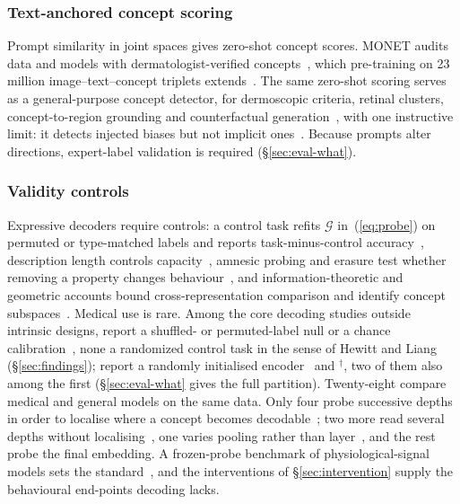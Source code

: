 \subsubsection{Text-anchored concept scoring}

Prompt similarity in joint spaces gives zero-shot concept scores. MONET audits data and models with
dermatologist-verified concepts~\cite{kim2024transparent}, which pre-training on 23 million
image--text--concept triplets extends~\cite{nie2025explainable}. The same zero-shot scoring serves as a general-purpose concept detector, for dermoscopic criteria, retinal
clusters, concept-to-region grounding and counterfactual
generation~\cite{patricio2023conceptbased,mensah2026interpretable,luo2025xbench,sadashivaiah2024explaining}, with one
instructive limit: it detects injected biases but not implicit ones~\cite{bertolini2025strengths}. Because prompts alter directions,
expert-label validation is required (\S\ref{sec:eval-what}).

\subsubsection{Validity controls}

Expressive decoders require controls: a control task refits $\mathcal G$ in~(\ref{eq:probe}) on permuted or
type-matched labels and reports task-minus-control accuracy~\cite{hewitt2019designing}, description length
controls capacity~\cite{voita2020information}, amnesic probing and erasure test whether removing a property
changes behaviour~\cite{elazar2020amnesic,ravfogel2020null,belrose2023leace}, and information-theoretic and
geometric accounts bound cross-representation comparison and identify concept
subspaces~\cite{pimentel2020informationtheoretic,guerner2023geometric}. Medical use is rare. Among the \Ndecni{} core decoding studies outside intrinsic
designs, \Nprobectrl{} report a shuffled- or permuted-label null or a chance
calibration~\cite{liang2026cheap,rahbar2026frozen,vig2026do,bertolini2025strengths,arasteh2026candor,steiner2026when,li2026acquisition,cajas2026shortkit},
none a randomized control task in the sense of
Hewitt and Liang (\S\ref{sec:findings}); \Nproberand{} report a randomly initialised
encoder~\cite{rahbar2026frozen,arasteh2026candor,svatko2026deep,farquhar2026pretraining} and \cite{tariq2024self}$^{\dagger}$, two of them also among the first (\S\ref{sec:eval-what} gives the full partition).
Twenty-eight compare medical and general models on the same data. Only four probe successive depths in order to
localise where a concept becomes decodable~\cite{pedersen2026look,rahbar2026frozen,vig2026do,vadori2025mind};
two more read several depths without localising~\cite{farquhar2026pretraining,demir2025downstream}, one varies
pooling rather than layer~\cite{muthyala2026frozen}, and the rest probe the final embedding. A frozen-probe benchmark of physiological-signal models sets the standard~\cite{zare2026eeg}, and the
interventions of \S\ref{sec:intervention} supply the behavioural end-points decoding lacks.


